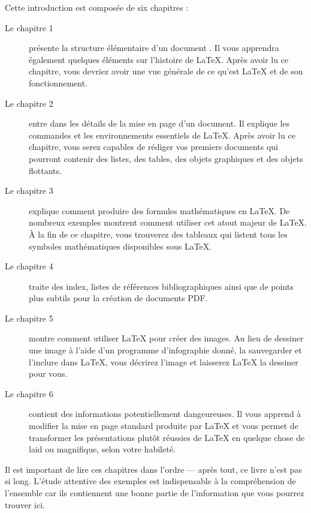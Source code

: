 \bigskip
\noindent Cette introduction est composée de six chapitres :
\begin{description}

\item[Le chapitre 1] présente la structure élémentaire d'un document
  \LaTeXe{}. Il vous apprendra également quelques éléments sur
  l'histoire de \LaTeX{}. Après avoir lu ce chapitre, vous devriez
  avoir une vue générale de ce qu'est \LaTeX{} et de son
  fonctionnement.

\item[Le chapitre 2] entre dans les détails de la mise en page d'un
  document. Il explique les commandes et les environnements
  essentiels de \LaTeX{}. Après avoir lu ce chapitre, vous serez
  capables de rédiger vos premiers documents qui pourront contenir des
  listes, des tables, des objets graphiques et des objets flottants.

\item[Le chapitre 3] explique comment produire des formules
  mathématiques en \LaTeX{}. De nombreux exemples
  montrent comment utiliser cet atout majeur de \LaTeX{}. À la fin de ce
  chapitre, vous trouverez des tableaux qui listent tous les symboles
  mathématiques disponibles sous \LaTeX{}.

\item[Le chapitre 4] traite des index, listes de
  références bibliographiques ainsi que de points plus subtils pour la
  création de documents PDF.

\item[Le chapitre 5] montre comment utiliser \LaTeX{} pour créer des
  images. Au lieu de dessiner une image à l'aide d'un programme
  d'infographie donné, la sauvegarder et l'inclure dans \LaTeX{}, vous
  décrirez l'image et laisserez \LaTeX{} la dessiner pour vous.

\item[Le chapitre 6] contient des informations potentiellement
  dangeureuses. Il vous apprend à modifier la mise en page standard
  produite par \LaTeX{} et vous  permet de transformer
  les présentations plutôt réussies de \LaTeX{} en quelque chose
  de laid ou magnifique, selon votre habileté.
\end{description}

\bigskip
\noindent Il est important de lire ces chapitres dans l'ordre --- après
tout, ce livre n'est pas si long.  L'étude attentive des exemples
est indispensable à la compréhension de l'ensemble car ils contiennent
une bonne partie de l'information que vous pourrez trouver ici.

